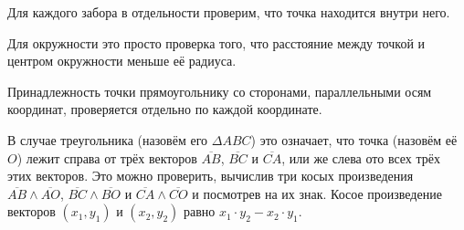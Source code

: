 Для каждого забора в отдельности проверим, что точка находится внутри него.

Для окружности это просто проверка того, что расстояние между точкой
и центром окружности меньше её радиуса.

Принадлежность точки прямоугольнику со сторонами, параллельными
осям координат, проверяется отдельно по каждой координате.

В случае треугольника (назовём его $\Delta ABC$) это означает,
что точка (назовём её $O$) лежит справа от трёх векторов $\overline{AB}$,
$\overline{BC}$ и $\overline{CA}$, или же слева ото всех трёх этих векторов.
Это можно проверить, вычислив три косых произведения
$\overline{AB} \wedge \overline{AO}$,
$\overline{BC} \wedge \overline{BO}$ и
$\overline{CA} \wedge \overline{CO}$ и посмотрев на их знак.
Косое произведение векторов $(x_1, y_1)$ и $(x_2, y_2)$ равно
$x_1 \cdot y_2 - x_2 \cdot y_1$.
